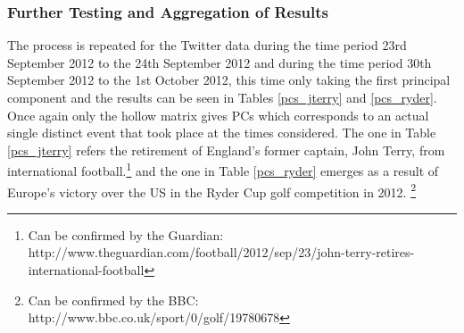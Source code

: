 \documentclass[11pt,a4paper]{article}
\begin{document}
\subsubsection*{Further Testing and Aggregation of Results}
\label{first_three_pcs}
The process is repeated for the Twitter data during the time period 23rd September 2012 to the 24th September 2012 and during the time period 30th September 2012 to the 1st October 2012, this time only taking the first principal component and the results can be seen in Tables \ref{pcs_jterry} and \ref{pcs_ryder}. Once again only the hollow matrix gives PCs which corresponds to an actual single distinct event that took place at the times considered. The one in Table \ref{pcs_jterry} refers the retirement of England's former captain, John Terry, from international football.\footnote{Can be confirmed by the Guardian: http://www.theguardian.com/football/2012/sep/23/john-terry-retires-international-football} and the one in Table \ref{pcs_ryder} emerges as a result of Europe's victory over the US in the Ryder Cup golf competition in 2012. \footnote{Can be confirmed by the BBC: http://www.bbc.co.uk/sport/0/golf/19780678}

\end{document}

